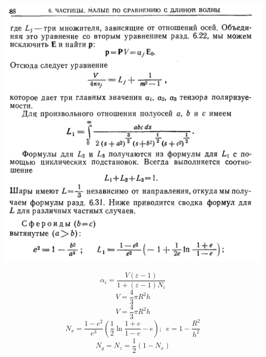 \documentclass[12pt]{article}
\begin{document}
\begin{large}
\includegraphics[width=1\textwidth]{photo_2.png}
\par
\[
    \alpha_i = \frac{V \left( \varepsilon - 1 \right)}{1 + \left( \varepsilon - 1 \right) N_i}
\]
\[
    V = \frac{4}{3}\pi R^2 h
\]
\[
    V = \frac{4}{3}\pi R^2 h
\]
\[
    N_x = \frac{1-e^2}{e^3}\left( \frac{1}{2} \ln \frac{1+e}{1-e} - e \right) ; \, \, \, e = 1 - \frac{R^2}{h^2}
\]
\[
    N_y = N_z = \frac{1}{2} \left( 1 - N_x \right)
\]

\end{large}
\end{document}
